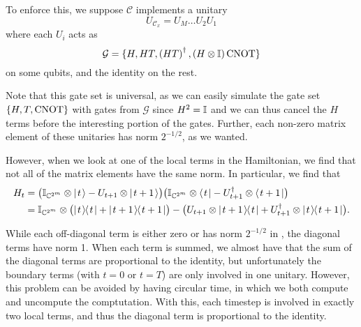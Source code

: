 \documentclass[../thesis-main/thesis-main]{subfiles}
\begin{document}
To enforce this, we suppose $\mathcal{C}$ implements a unitary 
\begin{equation}
U_{\mathcal{C}_{x}}=U_{M}\ldots U_{2}U_{1}\label{eq:single_qubit_circuit}
\end{equation}
 where each $U_{i}$ acts as
\begin{equation}
\mathcal{G}=\{H,HT,\left(HT\right)^{\dagger},\left(H\otimes\mathbb{I}\right)\mathrm{CNOT}\}
\end{equation}
on some qubits, and the identity on the rest.

Note that this gate set is universal, as we can easily simulate the gate set $\{H, T, \mathrm{CNOT}\}$ with gates from $\mathcal{G}$ since $H^2 = \mathbb{I}$ and we can thus cancel the $H$ terms before the interesting portion of the gates.  Further, each non-zero matrix element of these unitaries has norm $2^{-1/2}$, as we wanted.

However, when we look at one of the local terms in the Hamiltonian, we find that not all of the matrix elements have the same norm.  In particular, we find that
\begin{align}
  H_t &= \big(\mathbb{I}_{\mathbb{C}^{2^m}} \otimes |\mspace{2mu} t \mspace{2mu} \rangle - U_{t+1}\otimes|\mspace{2mu} t+1 \mspace{2mu} \rangle \big) \big(\mathbb{I}_{\mathbb{C}^{2^m}} \otimes \langle\mspace{2mu} t \mspace{2mu} | - U_{t+1}^\dag \otimes \langle\mspace{2mu} t+1 \mspace{2mu} |\big)\\
         &= \mathbb{I}_{\mathbb{C}^{2^m}} \otimes \big(|\mspace{2mu} t \mspace{2mu} \rangle\mspace{-2mu}\langle\mspace{2mu} t \mspace{2mu} | + |\mspace{2mu} t+1 \mspace{2mu} \rangle\mspace{-2mu}\langle\mspace{2mu} t+1 \mspace{2mu} |\big) - \big( U_{t+1} \otimes |\mspace{2mu} t+1 \mspace{2mu} \rangle\mspace{-2mu}\langle\mspace{2mu} t \mspace{2mu} | + U_{t+1}^\dag \otimes |\mspace{2mu} t \mspace{2mu} \rangle\mspace{-2mu}\langle\mspace{2mu} t+1 \mspace{2mu} |\big). \label{eq:circuit_to_Hamiltonian_term}
\end{align}

While each off-diagonal term is either zero or has norm $2^{-1/2}$ in , the diagonal terms have norm 1.  When each term is summed, we almost have that the sum of the diagonal terms are proportional to the identity, but unfortunately the boundary terms (with $t=0$ or $t=T$) are only involved in one unitary.  However, this problem can be avoided by having circular time, in which we both compute and uncompute the comptutation.  With this, each timestep is involved in exactly two local terms, and thus the diagonal term is proportional to the identity.
\end{document}
